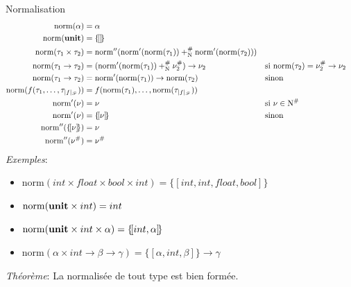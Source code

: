 \documentclass[serif]{beamer}
\newcommand{\exemples}{\textit{Exemples}\xspace}
\newcommand{\theoreme}{\textit{Théorème}\xspace}
\newcommand{\mset}[1]{\{\![#1]\!\}}
\newcommand{\unit}{\bold{unit}}
\newcommand{\norm}{\mathrm{norm}}
\newcommand{\F}{\mathscr{F}}
\newcommand{\N}{\mathrm{N}}
\begin{document}
\begin{frame}{Normalisation}
\tiny
\begin{align*}
		\norm (\alpha) &=
		\alpha
	\\
		\norm (\unit) &=
		\mset{}
	\\
		\norm (\tau_1 \times \tau_2) &=
		\norm'' (\norm' (\norm (\tau_1)) +^\#_\N \norm' (\norm (\tau_2)))
	\\
		\norm (\tau_1 \rightarrow \tau_2) &=
		(\norm' (\norm (\tau_1)) +^\#_\N \nu^\#_2) \rightarrow \nu_2 &&
		\text{si } \norm (\tau_2) = \nu^\#_2 \rightarrow \nu_2
	\\
		\norm (\tau_1 \rightarrow \tau_2) &=
		\norm' (\norm (\tau_1)) \rightarrow \norm (\tau_2) &&
		\text{sinon}
	\\
		\norm (f (\tau_1, \dots, \tau_{|f|_\F})) &=
		f (\norm (\tau_1), \dots, \norm (\tau_{|f|_\F}))
	\\
		\norm' (\nu) &=
		\nu &&
		\text{si } \nu \in \N^\#
	\\
		\norm' (\nu) &=
		\mset{\nu} &&
		\text{sinon}
	\\
		\norm'' (\mset{\nu}) &=
		\nu
	\\
		\norm'' (\nu^\#) &=
		\nu^\#
\end{align*}
\exemples :
\begin{itemize}
	\item $\norm (int \times float \times bool \times int) = \mset{int, int, float, bool}$
	\item $\norm (\unit \times int) = int$
	\item $\norm (\unit \times int \times \alpha) = \mset{int, \alpha}$
	\item $\norm (\alpha \times int \rightarrow \beta \rightarrow \gamma) = \mset{\alpha, int, \beta} \rightarrow \gamma$
\end{itemize}
\bigskip
\theoreme :
La normalisée de tout type est bien formée.
\end{frame}

\end{document}
